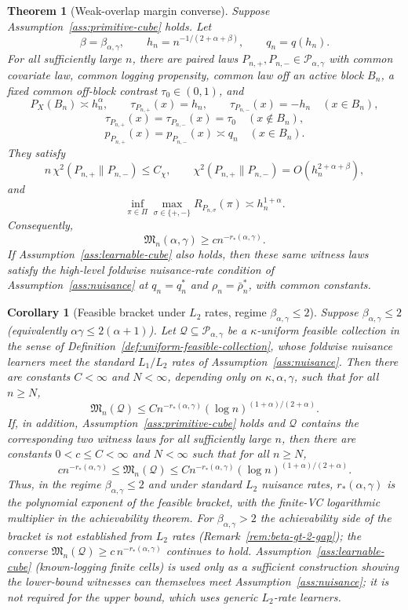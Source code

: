 \documentclass[11pt]{article}
\theoremstyle{definition}
\theoremstyle{plain}
\newtheorem{theorem}{Theorem}
\newtheorem{corollary}{Corollary}
\theoremstyle{remark}
\begin{document}
\begin{theorem}[Weak-overlap margin converse]\label{thm:lower-full-class}\label{conj:lower-calibration}
Suppose Assumption~\ref{ass:primitive-cube} holds.  Let
\[
\beta=\beta_{\alpha,\gamma},\qquad
h_n=n^{-1/(2+\alpha+\beta)},\qquad
q_n=q(h_n).
\]
For all sufficiently large \(n\), there are paired laws
\(P_{n,+},P_{n,-}\in\mathcal P_{\alpha,\gamma}\) with common covariate law,
common logging propensity, common law off an active block \(B_n\), a fixed
common off-block contrast \(\tau_0\in(0,1)\), and
\[
P_X(B_n)\asymp h_n^\alpha,\qquad
\tau_{P_{n,+}}(x)=h_n,\qquad
\tau_{P_{n,-}}(x)=-h_n
\quad (x\in B_n),
\]
\[
\tau_{P_{n,+}}(x)=\tau_{P_{n,-}}(x)=\tau_0
\quad (x\notin B_n),
\]
\[
p_{P_{n,+}}(x)=p_{P_{n,-}}(x)\asymp q_n
\quad (x\in B_n).
\]
They satisfy
\[
n\,\chi^2(P_{n,+}\|P_{n,-})\le C_\chi,
\qquad
\chi^2(P_{n,+}\|P_{n,-})=O(h_n^{2+\alpha+\beta}),
\]
and
\[
\inf_{\pi\in\Pi}
\max_{\sigma\in\{+,-\}}R_{P_{n,\sigma}}(\pi)
\asymp h_n^{1+\alpha}.
\]
Consequently,
\[
\mathfrak M_n(\alpha,\gamma)\ge c n^{-r_*(\alpha,\gamma)}.
\]
If Assumption~\ref{ass:learnable-cube} also holds, then these same witness
laws satisfy the high-level foldwise nuisance-rate condition of
Assumption~\ref{ass:nuisance} at \(q_n=q_n^*\) and
\(\rho_n=\bar\rho_n^*\), with common constants.
\end{theorem}

\begin{corollary}[Feasible bracket under \(L_2\) rates, regime \(\beta_{\alpha,\gamma}\le2\)]\label{cor:feasible-bracket}
Suppose \(\beta_{\alpha,\gamma}\le2\) (equivalently \(\alpha\gamma\le2(\alpha+1)\)).
Let \(\mathcal Q\subseteq\mathcal P_{\alpha,\gamma}\) be a
\(\kappa\)-uniform feasible collection in the sense of
Definition~\ref{def:uniform-feasible-collection}, whose foldwise nuisance
learners meet the standard \(L_1/L_2\) rates of Assumption~\ref{ass:nuisance}.
Then there are constants \(C<\infty\) and \(N<\infty\), depending only on
\(\kappa,\alpha,\gamma\), such that for all \(n\ge N\),
\[
\mathfrak M_n(\mathcal Q)
\le
C n^{-r_*(\alpha,\gamma)}(\log n)^{(1+\alpha)/(2+\alpha)}.
\]
If, in addition, Assumption~\ref{ass:primitive-cube} holds and \(\mathcal Q\)
contains the corresponding two witness laws for all sufficiently large \(n\),
then there are constants \(0<c\le C<\infty\) and \(N<\infty\) such that for all
\(n\ge N\),
\[
c n^{-r_*(\alpha,\gamma)}
\le
\mathfrak M_n(\mathcal Q)
\le
C n^{-r_*(\alpha,\gamma)}(\log n)^{(1+\alpha)/(2+\alpha)}.
\]
Thus, in the regime \(\beta_{\alpha,\gamma}\le2\) and under standard \(L_2\)
nuisance rates, \(r_*(\alpha,\gamma)\) is the polynomial exponent of the
feasible bracket, with the finite-VC logarithmic multiplier in the
achievability theorem.  For \(\beta_{\alpha,\gamma}>2\) the achievability side
of the bracket is not established from \(L_2\) rates
(Remark~\ref{rem:beta-gt-2-gap}); the converse \(\mathfrak M_n(\mathcal Q)\ge
c\,n^{-r_*(\alpha,\gamma)}\) continues to hold.  Assumption~\ref{ass:learnable-cube}
(known-logging finite cells) is used only as a sufficient construction showing
the lower-bound witnesses can themselves meet Assumption~\ref{ass:nuisance};
it is not required for the upper bound, which uses generic \(L_2\)-rate
learners.
\end{corollary}
\end{document}

